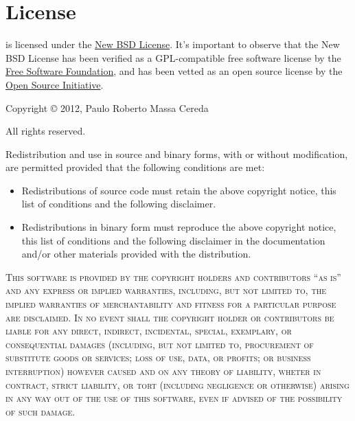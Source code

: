 \documentclass[a4paper,twoside,12pt]{memoir}
\begin{document}
\cleardoublepage

\section*{License}
\label{sec:license}

\arara is licensed under the \href{http://www.opensource.org/licenses/bsd-license.php}{New BSD License}. It's important to observe that the New BSD License has been verified as a GPL-compatible free software license by the \href{http://www.fsf.org/}{Free Software Foundation}, and has been vetted as an open source license by the \href{http://www.opensource.org/}{Open Source Initiative}.

\vfill

\begin{infobox}[skipabove=\baselineskip plus 2pt minus 1pt]

\vspace{.5em}

\noindent Copyright \copyright{} 2012, Paulo Roberto Massa Cereda

\noindent All rights reserved.

\vspace{1em}

\noindent Redistribution and use in source and binary forms, with or without modification, are permitted provided that the following conditions are met:

\vspace{1em}

\begin{itemize}
\item Redistributions of source code must retain the above copyright notice, this list of conditions and the following disclaimer.
\item Redistributions in binary form must reproduce the above copyright notice, this list of conditions and the following disclaimer in the documentation and/or other materials provided with the distribution.
\end{itemize}

\vspace{1em}

\noindent\textsc{This software is provided by the copyright holders and contributors ``as is'' and any express or implied warranties, including, but not limited to, the implied warranties of merchantability and fitness for a particular purpose are disclaimed. In no event shall the copyright holder or contributors be liable for any direct, indirect, incidental, special, exemplary, or consequential damages (including, but not limited to, procurement of substitute goods or services; loss of use, data, or profits; or business interruption) however caused and on any theory of liability, wheter in contract, strict liability, or tort (including negligence or otherwise) arising in any way out of the use of this software, even if advised of the possibility of such damage.}
\end{infobox}
\end{document}
